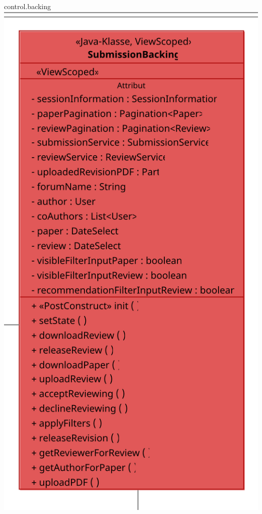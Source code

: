 \documentclass{beamer}
\begin{document}
    \begin{frame}{control.backing}
        \centering
        \includegraphics[height=0.9\textheight]{excerpts/SubmissionBacking@3x}
    \end{frame}
\end{document}
